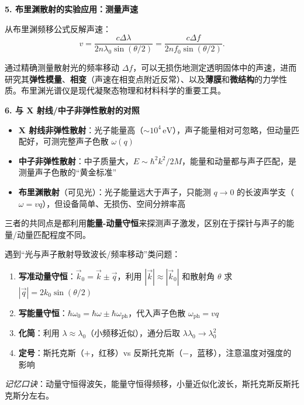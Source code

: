 \begin{insightbox}[物理图像与概念深化]
\textbf{5. 布里渊散射的实验应用：测量声速}

从布里渊频移公式反解声速：
\begin{equation}
v = \frac{c\Delta\lambda}{2n\lambda_0\sin(\theta/2)} = \frac{c\Delta f}{2nf_0\sin(\theta/2)}.
\end{equation}

通过精确测量散射光的频率移动 $\Delta f$，可以无损伤地测定透明固体中的声速，进而研究其\textbf{弹性模量}、\textbf{相变}（声速在相变点附近反常）、以及\textbf{薄膜}和\textbf{微结构}的力学性质。布里渊光谱仪是现代凝聚态物理和材料科学的重要工具。

\textbf{6. 与 X 射线/中子非弹性散射的对照}

\begin{itemize}
    \item \textbf{X 射线非弹性散射}：光子能量高（$\sim 10^{4}\,\mathrm{eV}$），声子能量相对可忽略，但动量匹配好，可测完整声子色散 $\omega(q)$
    \item \textbf{中子非弹性散射}：中子质量大，$E\sim\hbar^2k^2/2M$，能量和动量都与声子匹配，是测量声子色散的``黄金标准''
    \item \textbf{布里渊散射}（可见光）：光子能量远大于声子，只能测 $q\to0$ 的长波声学支（$\omega=vq$），但设备简单、无损伤、空间分辨率高
\end{itemize}

三者的共同点是都利用\textbf{能量-动量守恒}来探测声子激发，区别在于探针与声子的能量/动量匹配程度不同。
\end{insightbox}

\begin{thinkbox}
遇到``光与声子散射导致波长/频率移动''类问题：
\begin{enumerate}
    \item \textbf{写准动量守恒}：$\vec k_0 = \vec k \pm \vec q$，利用 $|\vec k|\approx|\vec k_0|$ 和散射角 $\theta$ 求 $|\vec q| = 2k_0\sin(\theta/2)$
    \item \textbf{写能量守恒}：$\hbar\omega_0 = \hbar\omega \pm \hbar\omega_\mathrm{ph}$，代入声子色散 $\omega_\mathrm{ph}=vq$
    \item \textbf{化简}：利用 $\lambda\approx\lambda_0$（小频移近似），通分后取 $\lambda\lambda_0\to\lambda_0^2$
    \item \textbf{定号}：斯托克斯（$+$，红移）vs 反斯托克斯（$-$，蓝移），注意温度对强度的影响
\end{enumerate}
\textit{记忆口诀}：动量守恒得波矢，能量守恒得频移，小量近似化波长，斯托克斯反斯托克斯分左右。
\end{thinkbox}

